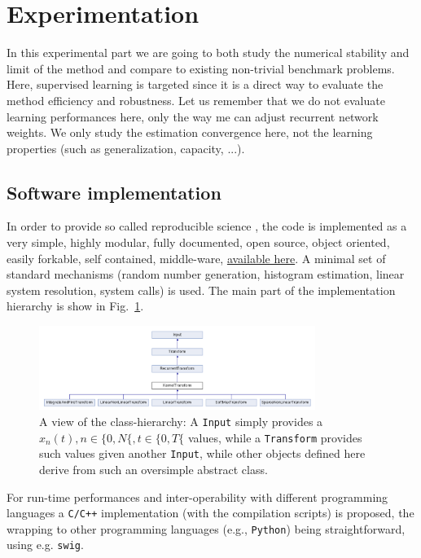 \section*{Experimentation}

In this experimental part we are going to both study the numerical stability and limit of the method and compare to existing non-trivial benchmark problems. Here, supervised learning is targeted since it is a direct way to evaluate the method efficiency and robustness. Let us remember that we do not evaluate learning performances here, only the way me can adjust recurrent network weights. We only study the estimation convergence here, not the learning properties (such as generalization, capacity, ...).

\subsection*{Software implementation}

In order to provide so called reproducible science \cite{topalidou_long_2015}, the code is implemented as a very simple, highly modular, fully documented, open source, object oriented, easily forkable, self contained, middle-ware, \href{nowhere:not-yet-on-line}{available here}. A minimal set of standard mechanisms (random number generation, histogram estimation, linear system resolution, system calls) is used. The main part of the implementation hierarchy is show in Fig.~\ref{class-hierarchy}. 

\begin{figure}[!ht]
  \includegraphics[width=0.8\textwidth]{img/class-hierarchy}
  \caption{A view of the class-hierarchy: A {\tt Input} simply provides a $x_n(t), n \in \{0, N\{, t \in \{0, T\{$ values, while a {\tt Transform} provides such values given another {\tt Input}, while other objects defined here derive from such an oversimple abstract class.}
  \label{class-hierarchy}
\end{figure}

For run-time performances and inter-operability with different programming languages a {\tt C/C++} implementation (with the compilation scripts) is proposed, the wrapping to other programming languages (e.g., {\tt Python}) being straightforward, using e.g. {\tt swig}. 

